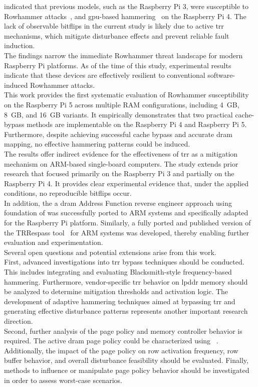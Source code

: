   indicated that previous models, such as the Raspberry Pi 3, were susceptible to Rowhammer 
  attacks~\cite{paperRHonRi3B+}, and \gls{gpu}-based hammering~\cite{paperOpenGL} on the Raspberry 
  Pi 4. The lack of observable bitflips in the current study is likely due to active 
  \gls{trr} mechanisms, which mitigate disturbance effects and prevent reliable fault induction.
  \\
  The findings narrow the immediate Rowhammer threat landscape for modern Raspberry Pi 
  platforms. As of the time of this study, experimental results indicate that these 
  devices are effectively resilient to conventional software-induced Rowhammer attacks.
  \\
  This work provides the first systematic evaluation of Rowhammer susceptibility on the 
  Raspberry Pi 5 across multiple RAM configurations, including 4~GB, 8~GB, and 16~GB variants. 
  It empirically demonstrates that two practical cache-bypass methods are implementable on 
  the Raspberry Pi 4 and Raspberry Pi 5. Furthermore, despite achieving successful cache 
  bypass and accurate \gls{dram} mapping, no effective hammering patterns could be induced.
  \\
  The results offer indirect evidence for the effectiveness of \gls{trr} as a mitigation 
  mechanism on ARM-based single-board computers. The study extends prior research that 
  focused primarily on the Raspberry Pi 3 and partially on the Raspberry Pi 4. It 
  provides clear experimental evidence that, under the applied conditions, no 
  reproducible bitflips occur.
  \\
  In addition, the a \gls{dram} Address Function reverse engineer approach using foundation of 
  \cite{paperDRAMA} was successfully ported to ARM systems 
  and specifically adapted for the Raspberry Pi platform. Similarly, a fully ported and 
  published version of the TRRespass tool~\cite{toolTRRespass} for 
  ARM systems was developed, thereby enabling further evaluation and experimentation.
  \\
  Several open questions and potential extensions arise from this work.
  \\
  First, advanced investigations into \gls{trr} bypass techniques should be conducted. This 
  includes integrating and evaluating Blacksmith-style frequency-based hammering. 
  Furthermore, vendor-specific \gls{trr} behavior on \gls{lpddr} memory should be analyzed to 
  determine mitigation thresholds and activation logic. The development of adaptive 
  hammering techniques aimed at bypassing \gls{trr} and generating effective disturbance 
  patterns represents another important research direction.
  \\
  Second, further analysis of the page policy and memory controller behavior is 
  required. The active \gls{dram} page policy could be characterized using ~\cite{paperNethammer}.
  Additionally, the impact of the page policy on row activation frequency, 
  row buffer behavior, and overall disturbance feasibility should be evaluated. 
  Finally, methods to influence or manipulate page policy behavior should be 
  investigated in order to assess worst-case scenarios.
